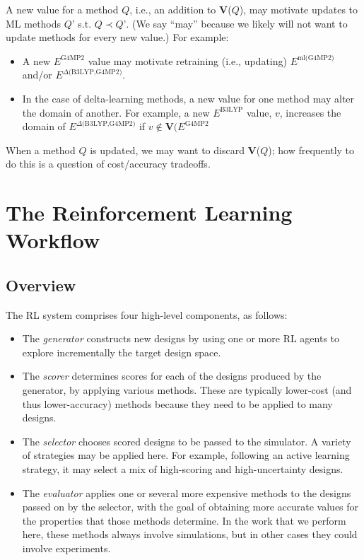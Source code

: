 \documentclass[10pt]{article}
\begin{document}
A new value for a method $Q$, i.e., an addition to \textbf{V}($Q$), may motivate updates to ML methods $Q’$ s.t. $Q \prec Q’$. 
(We say ``may'' because we likely will not want to update methods for every new value.)
For example:
\begin{itemize}\itemsep-0.2em 
\item
A new $E^{\textrm{G4MP2}}$ value may motivate retraining (i.e., updating) $E^{\textrm{ml(G4MP2)}}$ and/or $E^{\textrm{$\Delta$(B3LYP,G4MP2)}}$.
\item
In the case of delta-learning methods, a new value for one method may alter the domain of another.
For example, a new $E^{\textrm{B3LYP}}$  value, $v$, increases the domain of $E^{\textrm{$\Delta$(B3LYP,G4MP2)}}$ if $v \notin \textbf{V}(E^{\textrm{G4MP2}}$
\end{itemize}

When a method $Q$ is updated, we may want to discard \textbf{V}($Q$);
how frequently to do this is a question of cost/accuracy tradeoffs.


\section{The Reinforcement Learning Workflow}




\subsection{Overview}\label{sec:overview}

The RL system comprises four high-level components, as follows:

\begin{itemize}
\itemsep-0.2em 
\item
The \emph{generator} constructs new designs by using one or more RL agents to explore incrementally the target design space.

\item
The \emph{scorer} determines scores for each of the designs produced by the generator, by applying various methods.
These are typically lower-cost (and thus lower-accuracy) methods because they need to be applied to many designs.

\item
The \emph{selector} chooses scored designs to be passed to the simulator.
A variety of strategies may be applied here. For example, following an active learning strategy, it may select a mix of high-scoring and high-uncertainty designs.

\item
The \emph{evaluator} applies one or several more expensive methods to the designs passed on by the selector, with the goal of obtaining more accurate 
values for the properties that those methods determine. 
In the work that we perform here, these methods always involve simulations, but in other cases they could involve experiments.

\end{itemize}
\end{document}
